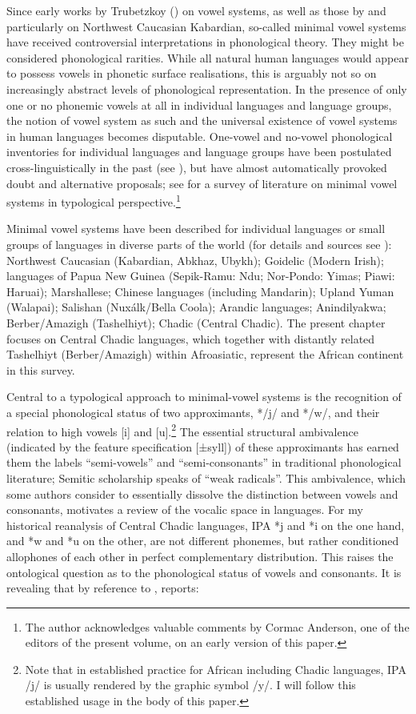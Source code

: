 \documentclass[output=paper]{langscibook}
\begin{document}
Since early works by Trubetzkoy (\citeyear{Trubetzkoy1925, Trubetzkoy1939}) on vowel systems, as well as those by \citet{Jakovlev1923} and particularly \citet{Kuipers1960} on Northwest Caucasian Kabardian, so-called minimal vowel systems have received controversial interpretations in phonological theory. They might be considered phonological rarities. While all natural human languages would appear to possess vowels in phonetic surface realisations, this is arguably not so on increasingly abstract levels of phonological representation. In the presence of only one or no phonemic vowels at all in individual languages and language groups, the notion of vowel system as such and the universal existence of vowel systems in human languages becomes disputable. One-vowel and no-vowel phonological inventories for individual languages and language groups have been postulated cross-linguistically in the past (see ), but have almost automatically provoked doubt and alternative proposals; see \citet[59--117]{Anderson2016} for a survey of literature on minimal vowel systems in typological perspective.\footnote{The author acknowledges valuable comments by Cormac Anderson, one of the editors of the present volume, on an early version of this paper.}

Minimal vowel systems have been described for individual languages or small groups of languages in diverse parts of the world (for details and sources see ): Northwest Caucasian (Kabardian, Abkhaz, Ubykh); Goidelic (Modern Irish); languages of Papua New Guinea (Sepik-Ramu: Ndu; Nor-Pondo: Yimas; Piawi: Haruai); Marshallese; Chinese languages (including Mandarin); Upland Yuman (Walapai); Salishan (Nuxálk/Bella Coola); Arandic languages; Anindilyakwa; Berber/Amazigh (Tashelhiyt); Chadic (Central Chadic). The present chapter focuses on Central Chadic languages, which together with distantly related Tashelhiyt (Berber/Amazigh) within Afroasiatic, represent the African continent in this survey.

Central to a typological approach to minimal-vowel systems is the recognition of a special phonological status of two approximants, */j/ and */w/, and their relation to high vowels [i] and [u].\footnote{Note that in established practice for African including Chadic languages, IPA /j/ is usually rendered by the graphic symbol /y/. I will follow this established usage in the body of this paper.} The essential structural ambivalence (indicated by the feature specification [±syll]) of these approximants has earned them the labels ``semi-vowels'' and ``semi-consonants'' in traditional phonological literature; Semitic scholarship speaks of ``weak radicals''. This ambivalence, which some authors consider to essentially dissolve the distinction between vowels and consonants, motivates a review of the vocalic space in languages. For my historical reanalysis of Central Chadic languages, IPA *j and *i on the one hand, and *w and *u on the other, are not different phonemes, but rather conditioned allophones of each other in perfect complementary distribution. This raises the ontological question as to the phonological status of vowels and consonants. It is revealing that by reference to \citet{ManasterRamerBicknell1995}, \citet[112]{Anderson2016} reports:
\end{document}
